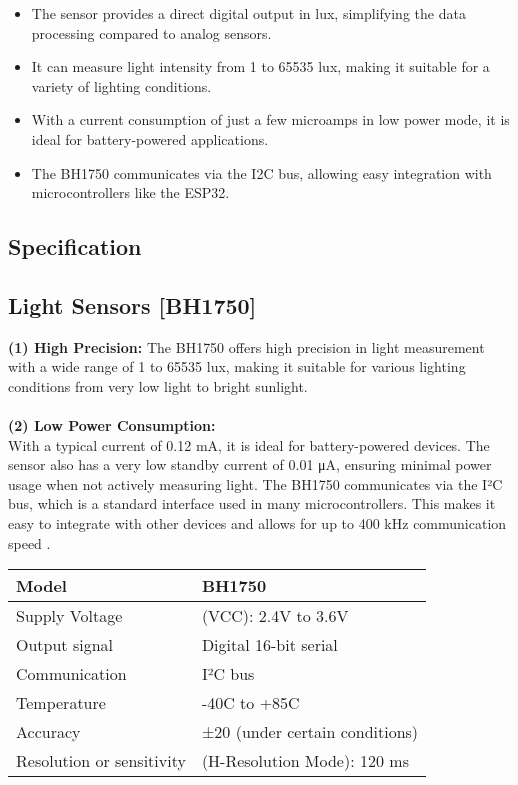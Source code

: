 \begin{itemize}
	\item[\checkmark] The sensor provides a direct digital output in lux, simplifying the data processing compared to analog sensors.
	\item[\checkmark] It can measure light intensity from 1 to 65535 lux, making it suitable for a variety of lighting conditions.
	\item[\checkmark] With a current consumption of just a few microamps in low power mode, it is ideal for battery-powered applications.
	\item[\checkmark] The BH1750 communicates via the I2C bus, allowing easy integration with microcontrollers like the ESP32.
\end{itemize}

\subsection{Specification}
\subsection{Light Sensors [BH1750]}

\textbf{(1) High Precision:} 
The BH1750 offers high precision in light measurement with a wide range of 1 to 65535 lux, making it suitable for various lighting conditions from very low light to \cite{Gao:2017} bright sunlight.\\ \\

\textbf{(2) Low Power Consumption:} \\
With a typical current  of 0.12 mA, it is ideal for battery-powered devices. The sensor also has a very low standby current of 0.01 μA, ensuring minimal power usage when not actively measuring light. The BH1750 communicates via the I²C bus, which is a standard interface used in many microcontrollers. This makes it easy to integrate with other devices and allows for up to 400 kHz communication speed \cite{Gupta:2024}.

\begin{center} %
	\begin{tabular}{|l|l|} %
		\hline %
		\textbf{Model} & \textbf{BH1750} \\
		\hline %
		Supply Voltage & (VCC): 2.4V to 3.6V \\
		\hline
		Output signal & Digital 16-bit serial \\
		\hline
		Communication & I²C bus \\
		\hline
		Temperature & -40C to +85C  \\
		\hline
		Accuracy & ±20 (under certain conditions)  \\
		\hline
		Resolution or sensitivity & (H-Resolution Mode): 120 ms \\
		
		\hline %
	\end{tabular}
\end{center}

